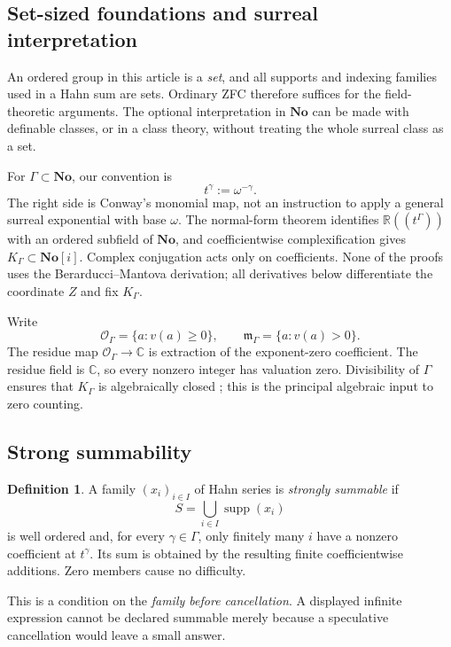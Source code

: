 \documentclass[11pt,letterpaper]{article}
\numberwithin{equation}{section}
\theoremstyle{definition}
\newtheorem{definition}[theorem]{Definition}
\theoremstyle{remark}
\newcommand{\No}{\mathbf{No}}
\newcommand{\C}{\mathbb C}
\newcommand{\R}{\mathbb R}
\newcommand{\supp}{\operatorname{supp}}
\begin{document}
\subsection{Set-sized foundations and surreal interpretation}
An ordered group in this article is a \emph{set}, and all supports and indexing
families used in a Hahn sum are sets. Ordinary ZFC therefore suffices for the
field-theoretic arguments. The optional interpretation in $\No$ can be made
with definable classes, or in a class theory, without treating the whole
surreal class as a set.

For $\Gamma\subset\No$, our convention is
\begin{equation}\label{eq:monomial}
 t^\gamma:=\omega^{-\gamma}.
\end{equation}
The right side is Conway's monomial map, not an instruction to apply a general
surreal exponential with base $\omega$. The normal-form theorem identifies
$\R((t^\Gamma))$ with an ordered subfield of $\No$, and coefficientwise
complexification gives $K_\Gamma\subset\No[i]$. Complex conjugation acts only
on coefficients. None of the proofs uses the Berarducci--Mantova derivation;
all derivatives below differentiate the coordinate $Z$ and fix $K_\Gamma$.

Write
\[
 \mathcal O_\Gamma=\{a:v(a)\ge0\},\qquad
 \mathfrak m_\Gamma=\{a:v(a)>0\}.
\]
The residue map $\mathcal O_\Gamma\to\C$ is extraction of the exponent-zero
coefficient. The residue field is $\C$, so every nonzero integer has valuation
zero. Divisibility of $\Gamma$ ensures that $K_\Gamma$ is algebraically closed
\cite[Corollary~4]{Poonen}; this is the principal algebraic input to zero counting.

\subsection{Strong summability}
\begin{definition}\label{def:strong}
A family $(x_i)_{i\in I}$ of Hahn series is \emph{strongly summable} if
\[
 S=\bigcup_{i\in I}\supp(x_i)
\]
is well ordered and, for every $\gamma\in\Gamma$, only finitely many $i$ have
a nonzero coefficient at $t^\gamma$. Its sum is obtained by the resulting
finite coefficientwise additions. Zero members cause no difficulty.
\end{definition}

This is a condition on the \emph{family before cancellation}. A displayed
infinite expression cannot be declared summable merely because a speculative
cancellation would leave a small answer.
\end{document}
